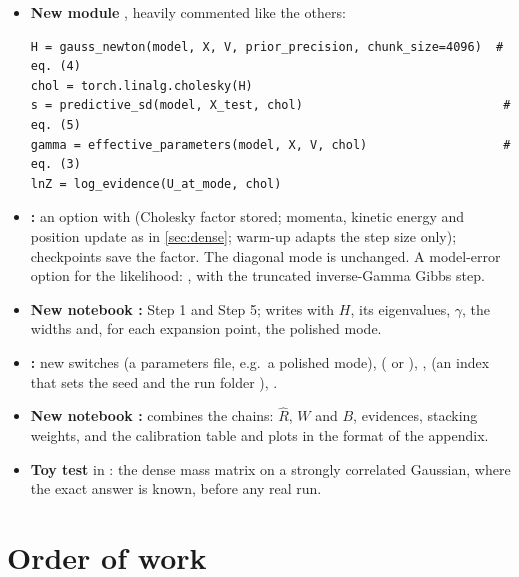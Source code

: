 \begin{itemize}
  \item \textbf{New module }, heavily commented like the others:
\begin{lstlisting}
H = gauss_newton(model, X, V, prior_precision, chunk_size=4096)  # eq. (4)
chol = torch.linalg.cholesky(H)
s = predictive_sd(model, X_test, chol)                            # eq. (5)
gamma = effective_parameters(model, X, V, chol)                   # eq. (3)
lnZ = log_evidence(U_at_mode, chol)
\end{lstlisting}
  \item \textbf{:} an option  with
     (Cholesky factor stored; momenta, kinetic energy and position
    update as in \cref{sec:dense}; warm-up adapts the step size only); checkpoints save the
    factor. The diagonal mode is unchanged. A model-error option for the
     likelihood: ,
    with the truncated inverse-Gamma Gibbs step.
  \item \textbf{New notebook :} Step 1 and Step 5; writes
     with $H$, its eigenvalues, $\gamma$, the widths and, for each
    expansion point, the polished mode.
  \item \textbf{:} new switches  (a parameters
    file, e.g.\ a polished mode),  ( or ),
    ,  (an index that sets the seed and the run folder
    ), .
  \item \textbf{New notebook :} combines the chains:
    $\hat R$, $W$ and $B$, evidences, stacking weights, and the calibration table and
    plots in the format of the appendix.
  \item \textbf{Toy test} in : the dense mass matrix on a strongly
    correlated Gaussian, where the exact answer is known, before any real run.
\end{itemize}

\section{Order of work}

